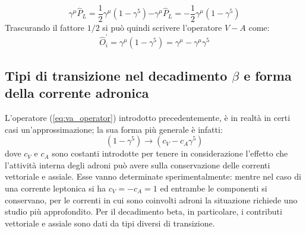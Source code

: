 \documentclass{subnucbo}
\begin{document}
\begin{subequations}
        \begin{equation}
                \gamma ^ { \mu } \hat { P } _ { L }  = \frac { 1 } { 2 } \gamma ^ { \mu } \left( 1 - \gamma ^ { 5 } \right)
                \label{subeq:pvp_exp}
        \end{equation}
        \begin{equation}
                - \gamma ^ { \mu } \hat { P } _ { L } = - \frac { 1 } { 2 } \gamma ^ { \mu } \left( 1 - \gamma ^ { 5 } \right)
                \label{subeq:pap_exp}
        \end{equation}
\end{subequations}
Trascurando il fattore $1/2$ si può quindi scrivere l'operatore $V-A$ come:
\begin{equation}
        \hat { O } _ { i } ^ { \prime } = \gamma ^ { \mu } \left( 1 - \gamma ^ { 5 } \right) = \gamma ^ { \mu } - \gamma ^ { \mu } \gamma ^ { 5 }
        \label{eq:va_operator}
\end{equation}

\subsection{Tipi di transizione nel decadimento $\beta$ e forma della corrente adronica}
\label{subsec:fermi_gt}
L'operatore (\ref{eq:va_operator}) introdotto precedentemente, è in realtà in certi casi un'approssimazione; la sua forma più generale è infatti:
\begin{equation}
        \left( 1 - \gamma ^ { 5 } \right) \rightarrow \left( c _ { V } - c _ { A } \gamma ^ { 5 } \right)
\end{equation}
dove $c_{V}$ e $c_{A}$ sono costanti introdotte per tenere in considerazione l'effetto che l'attività interna degli adroni può avere sulla conservazione delle correnti vettoriale e assiale. Esse vanno determinate sperimentalmente: mentre nel caso di una corrente leptonica si ha $c_{V}=-c_{A}=1$ ed entrambe le componenti si conservano, per le correnti in cui sono coinvolti adroni la situazione richiede uno studio più approfondito. Per il decadimento beta, in particolare, i contributi vettoriale e assiale sono dati da tipi diversi di transizione.
\end{document}
